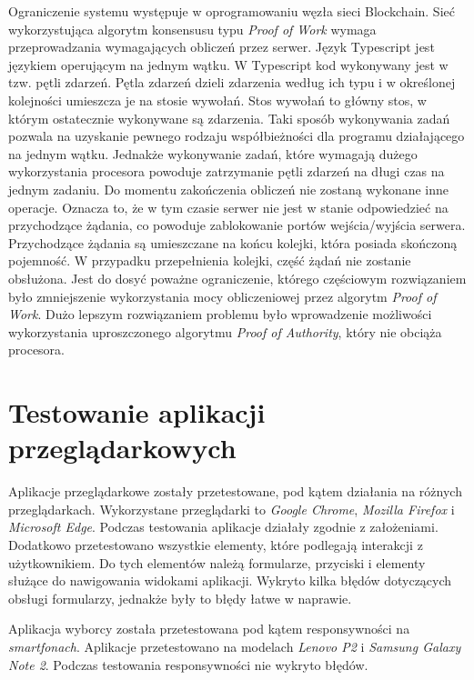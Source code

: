 \documentclass[a4paper,12pt]{book}
\begin{document}
Ograniczenie systemu występuje w oprogramowaniu węzła sieci Blockchain. Sieć wykorzystująca algorytm konsensusu typu \textit{Proof of Work} wymaga przeprowadzania wymagających obliczeń przez serwer. Język Typescript jest językiem operującym na jednym wątku. W Typescript kod wykonywany jest w tzw. pętli zdarzeń. Pętla zdarzeń dzieli zdarzenia według ich typu i w określonej kolejności umieszcza je na stosie wywołań. Stos wywołań to główny stos, w którym ostatecznie wykonywane są zdarzenia. Taki sposób wykonywania zadań pozwala na uzyskanie pewnego rodzaju współbieżności dla programu działającego na jednym wątku. Jednakże wykonywanie zadań, które wymagają dużego wykorzystania procesora powoduje zatrzymanie pętli zdarzeń na długi czas na jednym zadaniu. Do momentu zakończenia obliczeń nie zostaną wykonane inne operacje. Oznacza to, że w tym czasie serwer nie jest w stanie odpowiedzieć na przychodzące żądania, co powoduje zablokowanie portów wejścia/wyjścia serwera. Przychodzące żądania są umieszczane na końcu kolejki, która posiada skończoną pojemność. W przypadku przepełnienia kolejki, część żądań nie zostanie obsłużona. Jest do dosyć poważne ograniczenie, którego częściowym rozwiązaniem było zmniejszenie wykorzystania mocy obliczeniowej przez algorytm \textit{Proof of Work}. Dużo lepszym rozwiązaniem problemu było wprowadzenie możliwości wykorzystania uproszczonego algorytmu \textit{Proof of Authority}, który nie obciąża procesora.

\section{Testowanie aplikacji przeglądarkowych}

Aplikacje przeglądarkowe zostały przetestowane, pod kątem działania na różnych przeglądarkach. Wykorzystane przeglądarki to \textit{Google Chrome}, \textit{Mozilla Firefox} i \textit{Microsoft Edge}. Podczas testowania aplikacje działały zgodnie z założeniami. Dodatkowo przetestowano wszystkie elementy, które podlegają interakcji z użytkownikiem. Do tych elementów należą formularze, przyciski i elementy służące do nawigowania widokami aplikacji. Wykryto kilka błędów dotyczących obsługi formularzy, jednakże były to błędy łatwe w naprawie.

Aplikacja wyborcy została przetestowana pod kątem responsywności na \textit{smartfonach}. Aplikacje przetestowano na modelach \textit{Lenovo P2} i \textit{Samsung Galaxy Note 2}. Podczas testowania responsywności nie wykryto błędów.
 
\end{document}
